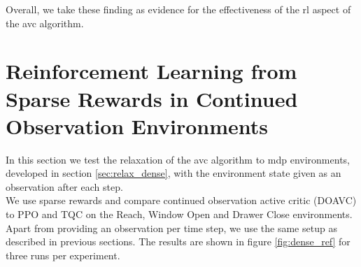 Overall, we take these finding as evidence for the effectiveness of the \ac{rl} aspect of the \ac{avc} algorithm.


\section{Reinforcement Learning from Sparse Rewards in Continued Observation Environments}
\label{sec_exp_con_obs}
In this section we test the relaxation of the \ac{avc} algorithm to \ac{mdp} environments, developed in section \ref{sec:relax_dense}, with the environment state given as an observation after each step. \\
We use sparse rewards 
and compare continued observation active critic (DOAVC) to PPO and TQC on the Reach, Window Open and Drawer Close environments. Apart from 
providing an observation per time step,
we use the same setup as described in previous sections. The results are shown in figure \ref{fig:dense_ref} for three runs per experiment.\\ 


